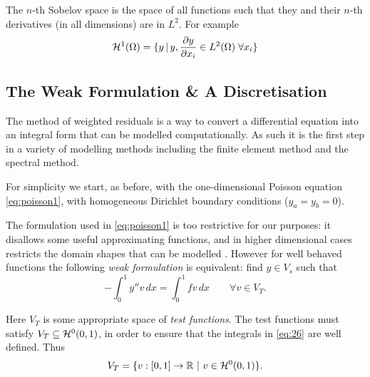 The $n$-th Sobelov space is the space of all functions such that they and their $n$-th derivatives (in all dimensions) are in $L^2$. For example
\begin{equation}
  \label{eq:H1}
  \mathcal{H}^1(\Omega) = \{ y \,|\, y, \frac{\partial y}{\partial x_i} \in L^2(\Omega) \; \forall x_i \}
\end{equation}

\subsection{The Weak Formulation \& A Discretisation}
\label{Derivation-of-weighted-residuals}

The method of weighted residuals is a way to convert a differential equation
into an integral form that can be modelled computationally. As such it is the
first step in a variety of modelling methods including the finite element method
and the spectral method.

For simplicity we start, as before, with the one-dimensional Poisson equation
\eqref{eq:poisson1}, with homogeneous Dirichlet boundary conditions
(\ie $y_{a}=y_{b}=0$).


The formulation used in \eqref{eq:poisson1} is too restrictive for our purposes:
it disallows some useful approximating functions, and in higher dimensional
cases restricts the domain shapes that can be modelled
\cite{HowardElmanDavidSilvester2006}. However for well behaved functions the
following \emph{weak formulation} is equivalent: find $y\in V_{s}$ such that
\begin{equation}
  -\int_{0}^{1}y''v\, dx=\int_{0}^{1}fv\, dx \qquad \forall v\in V_{T}.
  \label{eq:26}
\end{equation}

Here $V_{T}$ is some appropriate space of \emph{test functions}. The test
functions must satisfy $V_{T}\subseteq \mathcal{H}^0(0,1)$, in order to ensure that the integrals in \eqref{eq:26} are well defined. Thus
\begin{equation}
  \label{eq:28}
  V_{T}=\{v:[0,1]\rightarrow\mathbb{R}\, \,|\, \, v \in \mathcal{H}^0(0,1)\}.
\end{equation}

